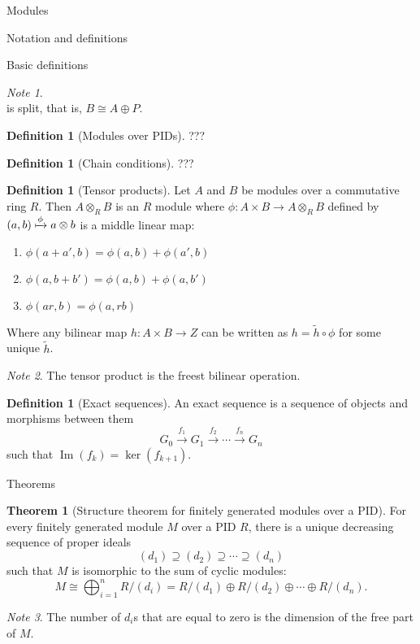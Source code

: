 \documentclass{article}
\theoremstyle{definition}
\newtheorem{theorem}{Theorem}
\numberwithin{theorem}{subsection} %
\theoremstyle{remark}
\newtheorem*{remark}{Note}
\theoremstyle{definition}
\newtheorem{definition}[paragraph]{Definition}
\newcommand{\im}{\operatorname{Im}}
\newcommand{\fn}[3]{{#1 \colon #2 \rightarrow #3}}
\begin{document}
\begin{section}{Modules}
\begin{subsection}{Notation and definitions}
\begin{subsubsection}{Basic definitions}
\begin{remark}
\[        \] is split, that is, $B \cong A \oplus P$.
      \end{remark}
      \begin{definition}[Modules over PIDs]
        ???
      \end{definition}
      \begin{definition}[Chain conditions]
        ???
      \end{definition}
      \begin{definition}[Tensor products]
        Let $A$ and $B$ be modules over a commutative ring $R$.
        Then $A \otimes_R B$ is an $R$ module where
        $\fn \phi {A \times B} {A \otimes_R B}$ defined by
        $(a, b) \xmapsto\phi a \otimes b$ is a middle linear map: \begin{enumerate}
          \item $\phi(a + a', b) = \phi(a, b) + \phi(a', b)$
          \item $\phi(a, b + b') = \phi(a, b) + \phi(a, b')$
          \item $\phi(ar, b) = \phi(a, rb)$
        \end{enumerate}
        Where any bilinear map $\fn h {A \times B} Z$ can be written as
        $h = \widetilde h \circ \phi$  for some unique $\widetilde h$.
      \end{definition}
      \begin{remark}
        The tensor product is the freest bilinear operation.
      \end{remark}
      \begin{definition}[Exact sequences]
        An exact sequence is a sequence of objects and morphisms between them \[
          G_0 \xrightarrow{f_1} G_1 \xrightarrow{f_2} \cdots \xrightarrow{f_n} G_n
        \] such that $\im(f_k) = \ker(f_{k+1})$.
      \end{definition}
    \end{subsubsection}
  \end{subsection}
  \begin{subsection}{Theorems}
    \begin{theorem}[Structure theorem for finitely generated modules over a PID]
      For every finitely generated module $M$ over a PID $R$, there is a unique
      decreasing sequence of proper ideals \[
        (d_1) \supseteq (d_2) \supseteq \cdots \supseteq (d_n)
      \] such that $M$ is isomorphic to the sum of cyclic modules: \[
        M \cong \bigoplus_{i=1}^n R/(d_i) = R/(d_1) \oplus R/(d_2) \oplus \cdots \oplus R/(d_n).
      \]
    \end{theorem}
    \begin{remark}
      The number of $d_i$s that are equal to zero is the dimension of the free
      part of $M$.
    \end{remark}
  \end{subsection}
\end{section}
\end{document}
